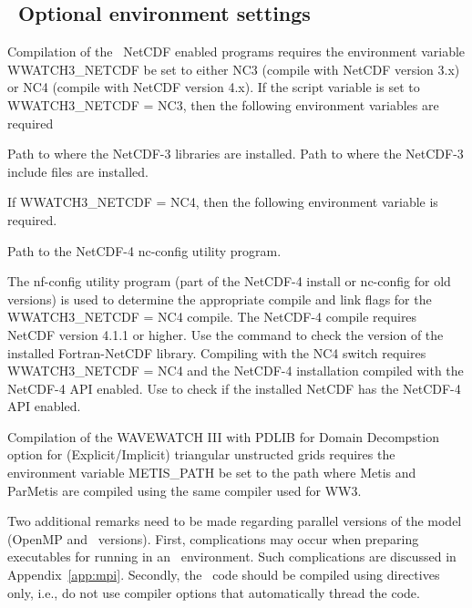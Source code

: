 \vssub
\subsection{~Optional environment settings}
\vssub

Compilation of the \ws\ NetCDF enabled programs requires the environment variable
{\code WWATCH3\_NETCDF} be set to either {\code NC3} (compile with NetCDF
version 3.x) or {\code NC4} (compile with NetCDF version 4.x).  If the script
variable is set to {\code WWATCH3\_NETCDF = NC3}, then the following
environment variables are required
\begin{clist}
 {Path to where the NetCDF-3 libraries are installed.}
 {Path to where the NetCDF-3 include files are installed.}
\end{clist}
If {\code WWATCH3\_NETCDF = NC4}, then the following environment variable
is required.
\begin{clist}
 {Path to the NetCDF-4 nc-config utility program.}
\end{clist}
The {\file nf-config} utility program (part of the NetCDF-4 install or 
{\file nc-config} for old versions) is used to determine the appropriate
compile and link flags for the {\code WWATCH3\_NETCDF = NC4} compile.
The NetCDF-4 compile requires NetCDF version 4.1.1 or higher.  Use the command
 to check the version of the installed 
Fortran-NetCDF library.  Compiling with the {\code NC4} switch requires
{\code WWATCH3\_NETCDF = NC4} and the NetCDF-4 installation compiled with the
NetCDF-4 API enabled.  Use  to check if the
installed NetCDF has the NetCDF-4 API enabled.

\vspace{\baselineskip} 
\noindent
Compilation of the WAVEWATCH III with PDLIB for Domain Decompstion option
for (Explicit/Implicit) triangular unstructed grids requires the environment
variable {\code METIS\_PATH} be set to the path where {\code Metis} and
{\code ParMetis} are compiled using the same compiler used for WW3.

\vspace{\baselineskip}
\noindent
Two additional remarks need to be made regarding parallel versions of the
model (OpenMP and \mpi\ versions). First, complications may occur when
preparing executables for running in an \mpi\ environment. Such complications
are discussed in Appendix~\ref{app:mpi}. Secondly, the \omp\ code should be
compiled using directives only, i.e., do not use compiler options that
automatically thread the code.



